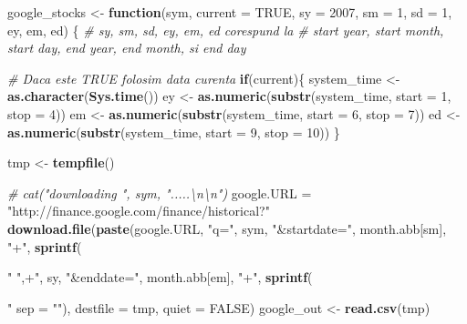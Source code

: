 \documentclass[]{article}
\newenvironment{Shaded}{\begin{snugshade}}{\end{snugshade}}
\newcommand{\KeywordTok}[1]{\textcolor[rgb]{0.13,0.29,0.53}{\textbf{#1}}}
\newcommand{\DataTypeTok}[1]{\textcolor[rgb]{0.13,0.29,0.53}{#1}}
\newcommand{\DecValTok}[1]{\textcolor[rgb]{0.00,0.00,0.81}{#1}}
\newcommand{\StringTok}[1]{\textcolor[rgb]{0.31,0.60,0.02}{#1}}
\newcommand{\CommentTok}[1]{\textcolor[rgb]{0.56,0.35,0.01}{\textit{#1}}}
\newcommand{\OtherTok}[1]{\textcolor[rgb]{0.56,0.35,0.01}{#1}}
\newcommand{\ControlFlowTok}[1]{\textcolor[rgb]{0.13,0.29,0.53}{\textbf{#1}}}
\newcommand{\NormalTok}[1]{#1}
\begin{document}
\begin{Shaded}
\begin{Highlighting}[]
\NormalTok{google_stocks <-}\StringTok{ }\ControlFlowTok{function}\NormalTok{(sym, }\DataTypeTok{current =} \OtherTok{TRUE}\NormalTok{, }\DataTypeTok{sy =} \DecValTok{2007}\NormalTok{, }\DataTypeTok{sm =} \DecValTok{1}\NormalTok{, }\DataTypeTok{sd =} \DecValTok{1}\NormalTok{, ey, em, ed)}
\NormalTok{\{}
  \CommentTok{# sy, sm, sd, ey, em, ed corespund la}
  \CommentTok{# start year, start month, start day, end year, end month, si end day}
  
  \CommentTok{# Daca este TRUE folosim data curenta}
  \ControlFlowTok{if}\NormalTok{(current)\{}
\NormalTok{    system_time <-}\StringTok{ }\KeywordTok{as.character}\NormalTok{(}\KeywordTok{Sys.time}\NormalTok{())}
\NormalTok{    ey <-}\StringTok{ }\KeywordTok{as.numeric}\NormalTok{(}\KeywordTok{substr}\NormalTok{(system_time, }\DataTypeTok{start =} \DecValTok{1}\NormalTok{, }\DataTypeTok{stop =} \DecValTok{4}\NormalTok{))}
\NormalTok{    em <-}\StringTok{ }\KeywordTok{as.numeric}\NormalTok{(}\KeywordTok{substr}\NormalTok{(system_time, }\DataTypeTok{start =} \DecValTok{6}\NormalTok{, }\DataTypeTok{stop =} \DecValTok{7}\NormalTok{))}
\NormalTok{    ed <-}\StringTok{ }\KeywordTok{as.numeric}\NormalTok{(}\KeywordTok{substr}\NormalTok{(system_time, }\DataTypeTok{start =} \DecValTok{9}\NormalTok{, }\DataTypeTok{stop =} \DecValTok{10}\NormalTok{))}
\NormalTok{  \}}

\NormalTok{  tmp <-}\StringTok{ }\KeywordTok{tempfile}\NormalTok{()}
  
  \CommentTok{# cat("downloading ", sym, ".....\textbackslash{}n\textbackslash{}n")}
\NormalTok{  google.URL =}\StringTok{ "http://finance.google.com/finance/historical?"}
  \KeywordTok{download.file}\NormalTok{(}\KeywordTok{paste}\NormalTok{(google.URL, }\StringTok{"q="}\NormalTok{, sym, }\StringTok{"&startdate="}\NormalTok{, }
\NormalTok{                      month.abb[sm], }\StringTok{"+"}\NormalTok{, }\KeywordTok{sprintf}\NormalTok{(}\StringTok{"%
                      \StringTok{",+"}\NormalTok{, sy, }\StringTok{"&enddate="}\NormalTok{, month.abb[em], }\StringTok{"+"}\NormalTok{, }
                      \KeywordTok{sprintf}\NormalTok{(}\StringTok{"%
                      \DataTypeTok{sep =} \StringTok{""}\NormalTok{), }\DataTypeTok{destfile =}\NormalTok{ tmp, }\DataTypeTok{quiet =} \OtherTok{FALSE}\NormalTok{)}
\NormalTok{  google_out <-}\StringTok{ }\KeywordTok{read.csv}\NormalTok{(tmp)}

}}
\end{Highlighting}
\end{Shaded}
\end{document}
